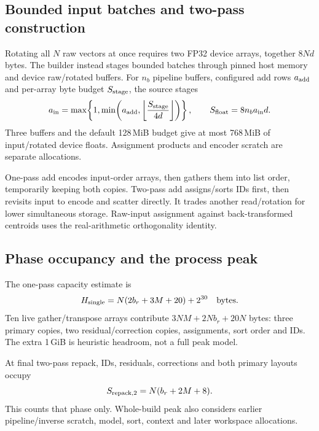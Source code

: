 \subsection{Bounded input batches and two-pass construction}

Rotating all $N$ raw vectors at once requires two FP32 device arrays,
together $8Nd$ bytes. The builder instead stages bounded batches through
pinned host memory and device raw/rotated buffers. For $n_b$ pipeline
buffers, configured add rows $a_{\rm add}$ and per-array byte budget
$S_{\rm stage}$, the source stages
\begin{equation}
 a_{\rm in}=\max\!\left\{1,\min\!\left(a_{\rm add},
 \left\lfloor\frac{S_{\rm stage}}{4d}\right\rfloor\right)\right\},
 \qquad S_{\rm float}=8n_ba_{\rm in}d.
 \label{eq:4-staging-rows}
\end{equation}
Three buffers and the default 128\,MiB budget give at most 768\,MiB of
input/rotated device floats. Assignment products and encoder scratch
are separate allocations.

One-pass add encodes input-order arrays, then gathers them into list order, temporarily keeping both copies. Two-pass add assigns/sorts IDs first, then revisits input to encode and scatter directly. It trades another read/rotation for lower simultaneous storage. Raw-input assignment against back-transformed centroids uses the real-arithmetic orthogonality identity.

\subsection{Phase occupancy and the process peak}

The one-pass capacity estimate is
\begin{equation}
 H_{\rm single}=N(2b_r+3M+20)+2^{30}\quad\text{bytes}.
 \label{eq:4-peak-heuristic}
\end{equation}
Ten live gather/transpose arrays contribute $3NM+2Nb_r+20N$ bytes: three primary copies, two residual/correction copies, assignments, sort order and IDs. The extra 1\,GiB is heuristic headroom, not a full peak model.

At final two-pass repack, IDs, residuals, corrections and both primary layouts occupy
\begin{equation}
 S_{\rm repack,2}=N(b_r+2M+8).
 \label{eq:4-two-pass-repack}
\end{equation}
This counts that phase only. Whole-build peak also considers earlier pipeline/inverse scratch, model, sort, context and later workspace allocations.

